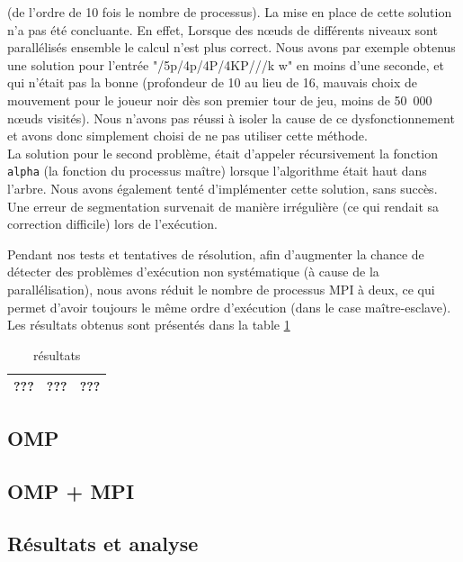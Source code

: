\documentclass[12pt]{article}
\begin{document}
    (de l'ordre de 10 fois le nombre de processus).
    La mise en place de cette solution n'a pas été concluante. En effet,
    Lorsque des n\oe uds de différents niveaux sont parallélisés ensemble
    le calcul n'est plus correct. Nous avons par exemple obtenus une solution
    pour l'entrée "/5p/4p/4P/4KP///k w" en moins d'une seconde, et qui
    n'était pas la bonne (profondeur de 10 au lieu de 16, mauvais choix de
    mouvement pour le joueur noir dès son premier tour de jeu, moins de
    50~000 n\oe uds visités). Nous n'avons pas réussi à isoler la cause de ce
    dysfonctionnement et avons donc simplement choisi de ne pas utiliser cette
    méthode.\\
    La solution pour le second problème, était d'appeler récursivement
    la fonction \texttt{alpha} (la fonction du processus maître)
    lorsque l'algorithme était haut dans l'arbre. Nous avons également
    tenté d'implémenter cette solution, sans succès. Une erreur
    de segmentation survenait de manière irrégulière (ce qui rendait sa correction
    difficile) lors de l'exécution.\\
    \par Pendant nos tests et tentatives de résolution, afin d'augmenter
    la chance de détecter des problèmes d'exécution non systématique (à
    cause de la parallélisation), nous avons réduit le nombre de processus MPI
    à deux, ce qui permet d'avoir toujours le même ordre d'exécution (dans le
    case maître-esclave).
    Les résultats obtenus sont présentés dans la table \ref{tab:alpha}
    \begin{table} \begin{center}
    	\begin{tabular}{|c|c|c|}
    	\hline
    	??? & ??? & ??? \\ \hline
    	\end{tabular}
    	\caption{\label{tab:alpha}\color{red} résultats}
    \end{center} \end{table}
    \subsection{OMP}
    \subsection{OMP + MPI}
    \subsection{Résultats et analyse}
\end{document}
